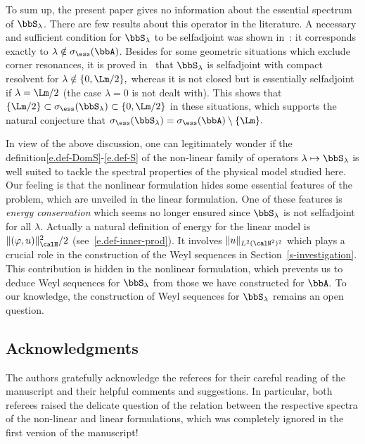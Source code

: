 To sum up, the present paper gives no information about the essential spectrum of $\bbS_\lambda$. There are few results about this operator in the literature. A necessary and sufficient condition for $\bbS_\lambda$ to be selfadjoint was shown in~\cite{Bon-Dau-Ram-99}: it corresponds exactly to $\lambda \notin \sigma_{\ess}(\bbA)$. Besides for some geometric situations which exclude corner resonances, it is proved in~\cite{Cac-Pan-Pos,Pan} that $\bbS_\lambda$ is selfadjoint with compact resolvent for $\lambda \notin \{0,\Lm/2\},$ whereas it is not closed but is essentially selfadjoint if $\lambda = \Lm/2$ (the case $\lambda = 0$ is not dealt with). This shows that $\{\Lm/2\} \subset \sigma_{\ess}(\bbS_\lambda) \subset \{0,\Lm/2\}$ in these situations, which supports the natural conjecture that $\sigma_{\ess}(\bbS_\lambda)\linebreak= \sigma_{\ess}(\bbA) \setminus \{\Lm\}.$

In view of the above discussion, one can legitimately wonder if the definition\linebreak\eqref{e.def-DomS}-\eqref{e.def-S} of the non-linear family of operators $\lambda \mapsto \bbS_\lambda$ is well suited to tackle the spectral properties of the physical model studied here. Our feeling is that the nonlinear formulation hides some essential features of the problem, which are unveiled in the linear formulation. One of these features is \emph{energy conservation} which seems no longer ensured since $\bbS_\lambda$ is not selfadjoint for all $\lambda.$ Actually a natural definition of energy for the linear model is $\| (\varphi,u) \|_\calH^2 / 2$ (see~\eqref{e.def-inner-prod}). It involves $\| u \|_{L^2(\calN^2)^2}$ which plays a crucial role in the construction of the Weyl sequences in Section~\ref{s-investigation}. This contribution is hidden in the nonlinear formulation, which prevents us to deduce Weyl sequences for $\bbS_\lambda$ from those we have constructed for $\bbA.$ To our knowledge, the construction of Weyl sequences for $\bbS_\lambda$ remains an open question.

\subsection*{Acknowledgments}
The authors gratefully acknowledge the referees for their careful reading of the manuscript and their helpful comments and suggestions. In particular, both referees raised the delicate question of the relation between the respective spectra of the non-linear and linear formulations, which was completely ignored in the first version of the manuscript!


